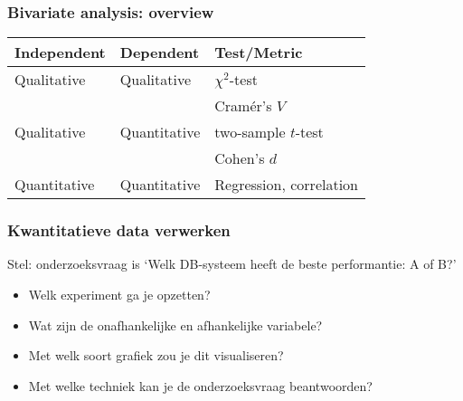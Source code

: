 \documentclass[aspectratio=169]{beamer}
\begin{document}
\begin{frame}
  \frametitle{Bivariate analysis: overview}
  \centering
  \begin{tabular}{lll}
    \toprule
    \textbf{Independent} & \textbf{Dependent} & \textbf{Test/Metric}    \\
    \midrule
    Qualitative          & Qualitative        & $\chi^2$-test           \\
                         &                    & Cramér's $V$            \\
    Qualitative          & Quantitative       & two-sample $t$-test     \\
                         &                    & Cohen's $d$             \\
    Quantitative         & Quantitative       & Regression, correlation \\
    \bottomrule
  \end{tabular}

  \bigskip

\end{frame}

\begin{frame}
  \frametitle{Kwantitatieve data verwerken}

  Stel: onderzoeksvraag is `Welk DB-systeem heeft de beste performantie: A of B?'

  \begin{itemize}
    \item<+-> Welk experiment ga je opzetten?
    \item<+-> Wat zijn de onafhankelijke en afhankelijke variabele?
    \item<+-> Met welk soort grafiek zou je dit visualiseren?
    \item<+-> Met welke techniek kan je de onderzoeksvraag beantwoorden?
  \end{itemize}

\end{frame}
\end{document}

